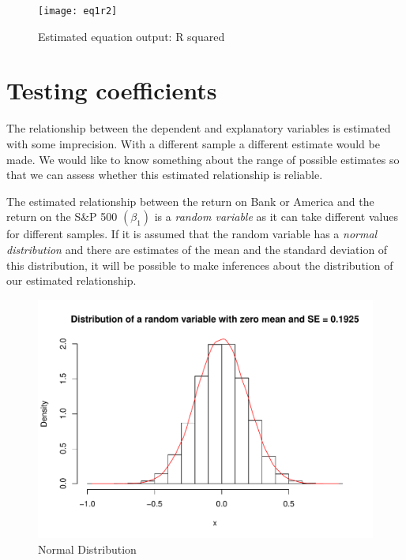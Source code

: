 \documentclass{article}\usepackage{graphicx, color}
\makeatletter
\def\maxwidth{ %
  \ifdim\Gin@nat@width>\linewidth
    \linewidth
  \else
    \Gin@nat@width
  \fi
}
\newenvironment{knitrout}{}{} %
\makeatother
\begin{document}
\begin{figure}[h!]
\graphicspath{{"../Eviews/Figures/"}}
\centering
\texttt{[image: eq1r2]}
\caption{Estimated equation output: R squared}
\label{OLS}
\end{figure}



\section{Testing coefficients}
The relationship between the dependent and explanatory variables is estimated with some imprecision.  With a different sample a different estimate would be made.  We would like to know something about the range of possible estimates so that we can assess whether this estimated relationship is reliable.   

The estimated relationship between the return on Bank or America and the return on the S\&P 500 $(\beta_1)$ is a \emph{random variable} as it can take different values for different samples.  If it is assumed that the random variable has a \emph{normal distribution} and there are estimates of the mean and the standard deviation of this distribution, it will be possible to make inferences about the distribution of our estimated relationship. 

\begin{knitrout}
\color{fgcolor}\begin{figure}[]

\includegraphics[width=\maxwidth]{figure/Normal} \caption[Normal Distribution]{Normal Distribution\label{fig:Normal}}
\end{figure}


\end{knitrout}
\end{document}

